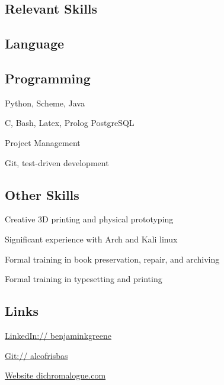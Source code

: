\documentclass{cv}
\begin{document}
{}
\noindent{}
\begin{paracol}{2}
\begin{raggedright}
\section{Relevant Skills}
\subsection{Language}
\subsection{Programming}
\begin{closeitems}
\item Python, Scheme, Java
\item C, Bash, Latex, Prolog PostgreSQL
\item Project Management
\item Git, test-driven development
\end{closeitems}
\subsection{Other Skills}
\begin{closeitems}
\item Creative 3D printing and physical prototyping
\item Significant experience with Arch and Kali linux
\item Formal training in book preservation, repair, and archiving
\item Formal training in typesetting and printing
\end{closeitems}
\subsection{Links}
\begin{closeitems}
\item \href{http://www.linkedin.com/in/benjaminkgreene}{LinkedIn:// \small{benjaminkgreene}}
\item \href{http://www.github.com/alcofrisbas}{Git:// \small{alcofrisbas}}
\item \href{http://www.dichromalogue.com}{Website \small{dichromalogue.com}}
\end{closeitems}

\end{raggedright}
\end{paracol}
\end{document}
